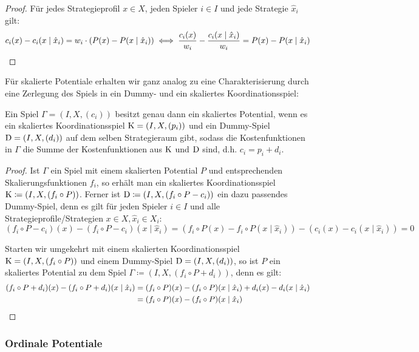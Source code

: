 \begin{proof}
	Für jedes Strategieprofil $x \in X$, jeden Spieler $i \in I$ und jede Strategie $\hat{x}_i$ gilt:
		\[c_i(x) - c_i(x \mid \hat{x}_i) = w_i\cdot(P(x) - P(x \mid \hat{x}_i)) \iff \frac{c_i(x)}{w_i} - \frac{c_i(x \mid \hat{x}_i)}{w_i} = P(x) - P(x \mid \hat{x}_i) \qedhere\]
\end{proof}

Für skalierte Potentiale erhalten wir ganz analog zu  eine Charakterisierung durch eine Zerlegung des Spiels in ein Dummy- und ein skaliertes Koordinationsspiel:

\begin{satz}\label{satz:CharSkalPot}
	Ein Spiel $\Gamma = (I, X, (c_i))$ besitzt genau dann ein skaliertes Potential, wenn es ein skaliertes Koordinationsspiel $\mathrm{K} = (I, X, (p_i))$ und ein Dummy-Spiel $\mathrm{D} = (I, X, (d_i))$ auf dem selben Strategieraum gibt, sodass die Kostenfunktionen in $\Gamma$ die Summe der Kostenfunktionen aus $\mathrm{K}$ und $\mathrm{D}$ sind, d.h. $c_i = p_i + d_i$.
\end{satz}

\begin{proof}
	Ist $\Gamma$ ein Spiel mit einem skalierten Potential $P$ und entsprechenden Skalierungsfunktionen $f_i$, so erhält man ein skaliertes Koordinationsspiel $\mathrm{K} \coloneqq (I, X, (f_i \circ P))$. Ferner ist $\mathrm{D} \coloneqq (I, X, (f_i\circ P-c_i))$ ein dazu passendes Dummy-Spiel, denn es gilt für jeden Spieler $i \in I$ und alle Strategieprofile/Strategien $x \in X, \hat{x}_i \in X_i$:
	\[(f_i\circ P-c_i)(x) - (f_i\circ P-c_i)(x \mid \hat{x}_i) = \left(f_i\circ P(x) - f_i\circ P(x \mid \hat{x}_i)\right) - \left(c_i(x) - c_i(x \mid \hat{x}_i)\right) = 0 \]
	
	Starten wir umgekehrt mit einem skalierten Koordinationsspiel $\mathrm{K} = (I, X, (f_i \circ P))$ und einem Dummy-Spiel $\mathrm{D} = (I, X, (d_i))$, so ist $P$ ein skaliertes Potential zu dem Spiel $\Gamma \coloneqq (I, X, (f_i\circ P + d_i))$, denn es gilt:
		\begin{align*}
			(f_i\circ P + d_i)(x) - (f_i\circ P + d_i)(x \mid \hat{x}_i) &= (f_i\circ P)(x) - (f_i\circ P)(x \mid \hat{x}_i) + d_i(x) - d_i(x \mid \hat{x}_i) \\
				&= (f_i\circ P)(x) - (f_i\circ P)(x \mid \hat{x}_i) \qedhere
		\end{align*}
\end{proof}


\subsubsection{Ordinale Potentiale}

